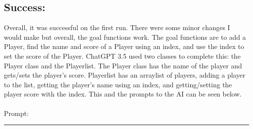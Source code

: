 \documentclass[a4paper,11pt]{article}
\begin{document}
\subsection*{Success:}
Overall, it was successful on the first run. There were some minor changes I would make but overall, the goal functions work. The goal functions are to add a Player, find the name and score of a Player using an index, and use the index to set the score of the Player. ChatGPT 3.5 used two classes to complete this: the Player class and the Playerlist. The Player class has the name of the player and gets/sets the player's score. Playerlist has an arraylist of players, adding a player to the list, getting the player’s name using an index, and getting/setting the player score with the index. This and the prompts to the AI can be seen below. \\\\
Prompt:
\hrule
\vspace{4pt} %
\end{document}
